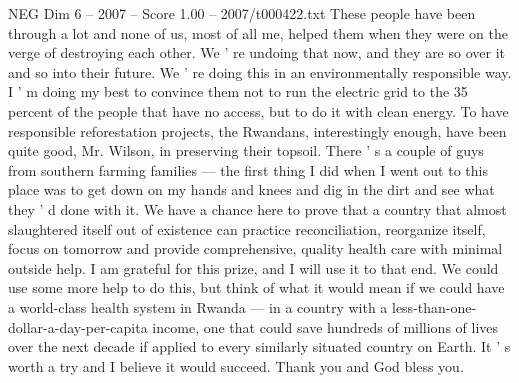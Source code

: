 \begin{textsample}{NEG Dim 6 – 2007 – Score 1.00 – 2007/t000422.txt}
These people have been through a lot and none of us, most of all me, helped them when they were on the verge of destroying each other.
We ' re undoing that now, and they are so over it and so into their future.
We ' re doing this in an environmentally responsible way.
I ' m doing my best to convince them not to run the electric grid to the 35 percent of the people that have no access, but to do it with clean energy.
To have responsible reforestation projects, the Rwandans, interestingly enough, have been quite good, Mr.
Wilson, in preserving their topsoil.
There ' s a couple of guys from southern farming families — the first thing I did when I went out to this place was to get down on my hands and knees and dig in the dirt and see what they ' d done with it.
We have a chance here to prove that a country that almost slaughtered itself out of existence can practice reconciliation, reorganize itself, focus on tomorrow and provide comprehensive, quality health care with minimal outside help.
I am grateful for this prize, and I will use it to that end.
We could use some more help to do this, but think of what it would mean if we could have a world-class health system in Rwanda — in a country with a less-than-one- dollar-a-day-per-capita income, one that could save hundreds of millions of lives over the next decade if applied to every similarly situated country on Earth.
It ' s worth a try and I believe it would succeed.
Thank you and God bless you.

\end{textsample}
